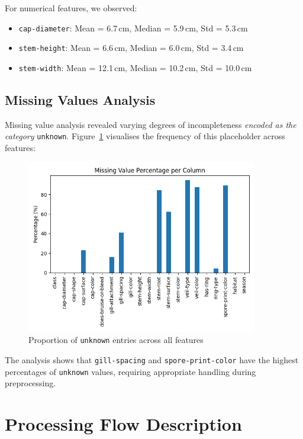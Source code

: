\documentclass[11pt,a4paper]{article}
\begin{document}
For numerical features, we observed:
\begin{itemize}
    \item \texttt{cap-diameter}: Mean = 6.7\,cm, Median = 5.9\,cm, Std = 5.3\,cm
    \item \texttt{stem-height}: Mean = 6.6\,cm, Median = 6.0\,cm, Std = 3.4\,cm  
    \item \texttt{stem-width}: Mean = 12.1\,cm, Median = 10.2\,cm, Std = 10.0\,cm
\end{itemize}

\subsection{Missing Values Analysis}

Missing value analysis revealed varying degrees of incompleteness \emph{encoded as the category} \texttt{unknown}. Figure~\ref{fig:missing_values} visualises the frequency of this placeholder across features:

\begin{figure}[H]
    \centering
    \includegraphics[width=0.9\textwidth]{figures/eda_missing.png}
    \caption{Proportion of \texttt{unknown} entries across all features}
    \label{fig:missing_values}
\end{figure}

The analysis shows that \texttt{gill-spacing} and \texttt{spore-print-color} have the highest percentages of \texttt{unknown} values, requiring appropriate handling during preprocessing.

\section{Processing Flow Description}
\label{sec:processing}
\end{document}

